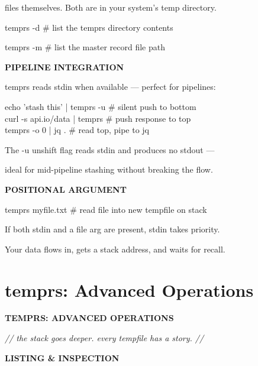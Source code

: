 \documentclass[11pt,a4paper,twoside]{book}
\begin{document}
files themselves. Both are in your system's temp directory.

temprs -d           \# list the temprs directory contents

temprs -m           \# list the master record file path


\vspace{12pt}
{\bfseries\color{neonyellow} PIPELINE INTEGRATION}\vspace{4pt}

temprs reads stdin when available — perfect for pipelines:

\begin{codebox}
echo 'stash this' | temprs -u  \# silent push to bottom\\
curl -s api.io/data | temprs    \# push response to top\\
temprs -o 0 | jq .             \# read top, pipe to jq\\
\end{codebox}

The -u unshift flag reads stdin and produces no stdout —

ideal for mid-pipeline stashing without breaking the flow.


\vspace{12pt}
{\bfseries\color{neonyellow} POSITIONAL ARGUMENT}\vspace{4pt}

temprs myfile.txt   \# read file into new tempfile on stack

If both stdin and a file arg are present, stdin takes priority.

Your data flows in, gets a stack address, and waits for recall.


\vspace{16pt}

\section{temprs: Advanced Operations}


\vspace{10pt}
{\large\bfseries\color{neoncyan} TEMPRS: ADVANCED OPERATIONS}\vspace{6pt}

{\small\itshape\color{dimtext} // the stack goes deeper. every tempfile has a story. //}


\vspace{12pt}
{\bfseries\color{neonyellow} LISTING \& INSPECTION}\vspace{4pt}
\end{document}

